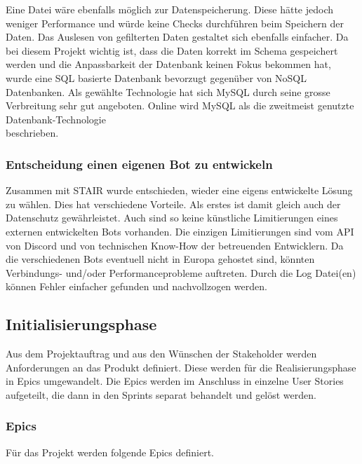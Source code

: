 \documentclass[a4paper, table]{article}
\begin{document}
Eine Datei wäre ebenfalls möglich zur Datenspeicherung.
Diese hätte jedoch weniger Performance und würde keine Checks durchführen beim Speichern der Daten.
Das Auslesen von gefilterten Daten gestaltet sich ebenfalls einfacher.\autocite{castro_why_2020}
Da bei diesem Projekt wichtig ist, dass die Daten korrekt im Schema gespeichert werden und die Anpassbarkeit der Datenbank keinen Fokus bekommen hat, wurde eine SQL basierte Datenbank bevorzugt gegenüber von NoSQL Datenbanken.
Als gewählte Technologie hat sich MySQL durch seine grosse Verbreitung sehr gut angeboten.
Online wird MySQL als die zweitmeist genutzte Datenbank-Technologie\\beschrieben.\autocite{noauthor_db-engines_2022}

\subsubsection*{Entscheidung einen eigenen Bot zu entwickeln}
Zusammen mit STAIR wurde entschieden, wieder eine eigens entwickelte Lösung zu wählen.
Dies hat verschiedene Vorteile.
Als erstes ist damit gleich auch der Datenschutz gewährleistet.
Auch sind so keine künstliche Limitierungen eines externen entwickelten Bots vorhanden.
Die einzigen Limitierungen sind vom \gls{API} von Discord und von technischen Know-How der betreuenden Entwicklern.
Da die verschiedenen Bots eventuell nicht in Europa gehostet sind, könnten Verbindungs- und/oder Performanceprobleme auftreten.
Durch die Log Datei(en) können Fehler einfacher gefunden und nachvollzogen werden.
\newpage
\subsection{Initialisierungsphase}
Aus dem Projektauftrag und aus den Wünschen der Stakeholder werden Anforderungen an das Produkt definiert.
Diese werden für die Realisierungsphase in Epics umgewandelt.
Die Epics werden im Anschluss in einzelne User Stories aufgeteilt, die dann in den Sprints separat behandelt und gelöst werden.

\subsubsection{Epics}\label{Epics}
Für das Projekt werden folgende Epics definiert.
\end{document}
